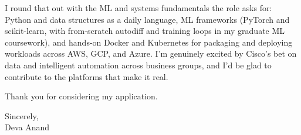 \documentclass[letterpaper,11pt]{article}
\begin{document}
I round that out with the ML and systems fundamentals the role asks for: Python and data structures as a daily language, ML frameworks (PyTorch and scikit-learn, with from-scratch autodiff and training loops in my graduate ML coursework), and hands-on Docker and Kubernetes for packaging and deploying workloads across AWS, GCP, and Azure. I'm genuinely excited by Cisco's bet on data and intelligent automation across business groups, and I'd be glad to contribute to the platforms that make it real.

Thank you for considering my application.

\vspace{8pt}
Sincerely, \\
Deva Anand
\end{document}
